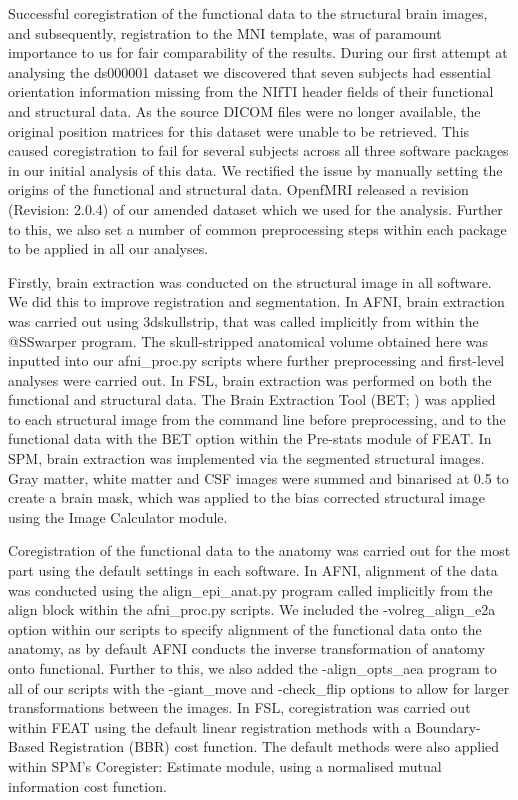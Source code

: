 Successful coregistration of the functional data to the structural brain images, and subsequently, registration to the MNI template, was of paramount importance to us for fair comparability of the results. During our first attempt at analysing the ds000001 dataset we discovered that seven subjects had essential orientation information missing from the NIfTI header fields of their functional and structural data. As the source DICOM files were no longer available, the original position matrices for this dataset were unable to be retrieved. This caused coregistration to fail for several subjects across all three software packages in our initial analysis of this data. We rectified the issue by manually setting the origins of the functional and structural data. OpenfMRI released a revision (Revision: 2.0.4) of our amended dataset which we used for the analysis. Further to this, we also set a number of common preprocessing steps within each package to be applied in all our analyses.   

Firstly, brain extraction was conducted on the structural image in all software. We did this to improve registration and segmentation. In AFNI, brain extraction was carried out using 3dskullstrip, that was called implicitly from within the @SSwarper program. The skull-stripped anatomical volume obtained here was inputted into our afni\_proc.py scripts where further preprocessing and first-level analyses were carried out.  In FSL, brain extraction was performed on both the functional and structural data. The Brain Extraction Tool (BET; \citep{Smith2002-vw}) was applied to each structural image from the command line before preprocessing, and to the functional data with the BET option within the Pre-stats module of FEAT. In SPM, brain extraction was implemented via the segmented structural images. Gray matter, white matter and CSF images were summed and binarised at 0.5 to create a brain mask, which was applied to the bias corrected structural image using the Image Calculator module. 

Coregistration of the functional data to the anatomy was carried out for the most part using the default settings in each software. In AFNI, alignment of the data was conducted using the align\_epi\_anat.py program called implicitly from the align block within the afni\_proc.py scripts. We included the -volreg\_align\_e2a option within our scripts to specify alignment of the functional data onto the anatomy, as by default AFNI conducts the inverse transformation of anatomy onto functional. Further to this, we also added the -align\_opts\_aea program to all of our scripts with the -giant\_move and -check\_flip options to allow for larger transformations between the images. In FSL, coregistration was carried out within FEAT using the default linear registration methods with a Boundary-Based Registration (BBR) cost function. The default methods were also applied within SPM's Coregister: Estimate module, using a normalised mutual information cost function. 

